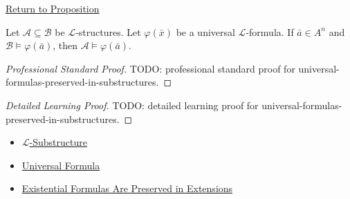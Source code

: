 \newpage
{}
\label{prf:universal-formulas-preserved-in-substructures}

\begin{remark*}[Return]
\hyperref[prop:universal-formulas-preserved-in-substructures]{Return to Proposition}
\end{remark*}

\begin{proposition*}
Let $\mathcal{A}\subseteq\mathcal{B}$ be $\mathcal{L}$-structures. Let
$\varphi(\bar x)$ be a universal $\mathcal{L}$-formula. If
$\bar a\in A^n$ and $\mathcal{B}\models\varphi(\bar a)$, then
$\mathcal{A}\models\varphi(\bar a)$.
\end{proposition*}

\begin{proof}[Professional Standard Proof]
\LRAProofBodyStart
TODO: professional standard proof for universal-formulas-preserved-in-substructures.
\end{proof}

\begin{proof}[Detailed Learning Proof]
\LRAProofBodyStart
TODO: detailed learning proof for universal-formulas-preserved-in-substructures.
\end{proof}

\begin{remark*}
\end{remark*}

\begin{dependencies}
\begin{itemize}
  \item \hyperref[def:l-substructure]{$\mathcal{L}$-Substructure}
  \item \hyperref[def:universal-formula]{Universal Formula}
  \item \hyperref[prop:existential-formulas-preserved-in-extensions]{Existential Formulas Are Preserved in Extensions}
\end{itemize}
\end{dependencies}

\clearpage
